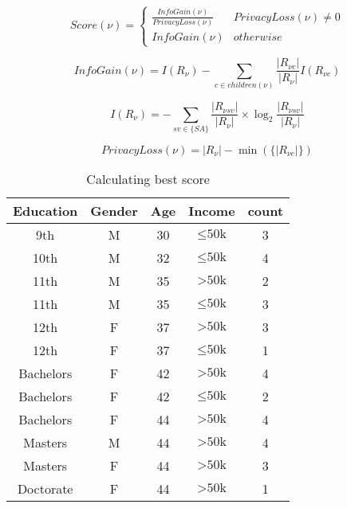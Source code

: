 \documentclass[11pt]{article}       %
\begin{document}
\begin{equation}
Score(\nu) = \begin{cases}
\frac{InfoGain(\nu)} {PrivacyLoss(\nu)} & PrivacyLoss(\nu) \neq 0\\
InfoGain(\nu) & otherwise
\end{cases}
\label{score}
\end{equation}

\begin{equation}
InfoGain(\nu) = I(R_\nu) - \sum\limits_{\text{$c$} \in children(\nu)} \frac{|R_{\nu\text{$c$}}|}{|R_\nu|} I(R_{\nu\text{$c$}})
\label{infoGain}
\end{equation}

\begin{equation}
I(R_\nu) = - \sum\limits_{sv \in \text{\{$SA$\}}} \frac{| R_{\nu\text{$sv$}} |}{ | R_\nu |} \times \log_2 \frac{| R_{\nu\text{$sv$}} |}{ | R_\nu |}
\label{entropy}
\end{equation}

\begin{equation}
PrivacyLoss(\nu) = |R_\nu| - \min(\{|R_{\nu c}|\})
\label{privacyLoss}
\end{equation}

\begin{table}[htp]
\begin{center}
\begin{tabular}{|c|c|c|c|c|}
\hline
Education & Gender & Age & Income & count \\
\hline
9th & M & 30 & $\leq \text{50k}$ & 3 \\
10th & M & 32 & $\leq \text{50k}$ & 4 \\
11th & M & 35 & $> \text{50k}$ & 2 \\
11th & M & 35 & $\leq \text{50k}$ & 3 \\
12th & F & 37 & $> \text{50k}$ & 3 \\
12th & F & 37 & $\leq \text{50k}$ & 1 \\
\hline
Bachelors & F & 42 & $> \text{50k}$ & 4 \\
Bachelors & F & 42 & $\leq \text{50k}$ & 2 \\
Bachelors & F & 44 & $> \text{50k}$ & 4 \\
Masters & M & 44 & $> \text{50k}$ & 4 \\
Masters & F & 44 & $> \text{50k}$ & 3 \\
Doctorate & F & 44 & $> \text{50k}$ & 1 \\
\hline
\end{tabular}
\end{center}
\caption{Calculating best score}
\label{table2}
\end{table}
\end{document}
